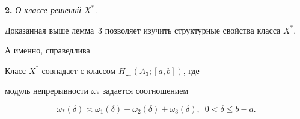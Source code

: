 




{\bf 2.} {\it О классе решений $X^*$.}


Доказанная выше лемма~3 позволяет изучить структурные свойства класса $X^*$.


А именно, справедлива





\begin{thm}


Класс $X^*$ совпадает с классом $H_{\omega_*}(A_3;[a,b])$, где


модуль непрерывности $\omega_*$ задается соотношением


$$


\omega_*(\delta)\asymp \omega_1(\delta)+\omega_2(\delta)+


\omega_3(\delta),\ \; 0<\delta\leq b-a.


$$


\end{thm}





